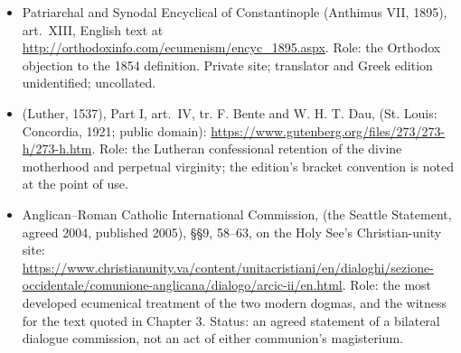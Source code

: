 \begin{itemize}
\item Patriarchal and Synodal Encyclical of Constantinople (Anthimus
VII, 1895), art.~XIII, English text at
\url{http://orthodoxinfo.com/ecumenism/encyc_1895.aspx}. Role: the
Orthodox objection to the 1854 definition. Private site; translator and
Greek edition unidentified; uncollated.
\item {} (Luther, 1537), Part I, art.~IV, tr.
F. Bente and W. H. T. Dau,  (St. Louis:
Concordia, 1921; public domain):
\url{https://www.gutenberg.org/files/273/273-h/273-h.htm}. Role: the
Lutheran confessional retention of the divine motherhood and perpetual
virginity; the edition's bracket convention is noted at the point of use.
\item Anglican--Roman Catholic International Commission,  (the Seattle Statement, agreed 2004, published
2005), \S\S9, 58--63, on the Holy See's Christian-unity site:
\url{https://www.christianunity.va/content/unitacristiani/en/dialoghi/sezione-occidentale/comunione-anglicana/dialogo/arcic-ii/en.html}.
Role: the most developed ecumenical treatment of the two modern dogmas,
and the witness for the  text quoted in
Chapter 3. Status: an agreed statement of a bilateral dialogue
commission, not an act of either communion's magisterium.
\end{itemize}

